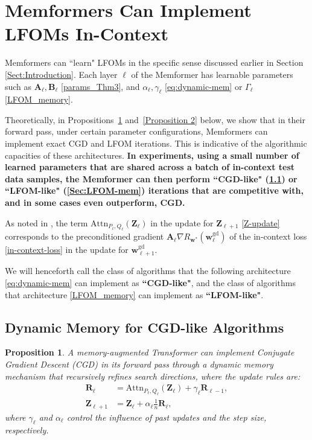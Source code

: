 \documentclass[11pt]{article}
\numberwithin{equation}{section}
\newtheorem{proposition}{Proposition}
\begin{document}
\section{Memformers Can Implement LFOMs In-Context}

Memformers can ``learn" LFOMs in the specific sense discussed earlier in Section \ref{Sect:Introduction}. Each layer \(\ell\) of the Memformer has learnable parameters such as \( \mathbf{A}_{\ell}, \mathbf{B}_{\ell} \) \eqref{params_Thm3}, and \(\alpha_{\ell}, \gamma_{\ell}\) \eqref{eq:dynamic-mem} or \(\Gamma_{\ell}\) \eqref{LFOM_memory}.

Theoretically, in Propositions~\ref{Proposition 1} and~\ref{Proposition 2} below, we show that in their forward pass, under certain parameter configurations, Memformers can implement exact CGD and LFOM iterations. This is indicative of the algorithmic capacities of these architectures. \textbf{In experiments, using a small number of learned parameters that are shared across a batch of in-context test data samples, the Memformer can then perform ``CGD-like" (\ref{Sec:dynamic-mem}) or ``LFOM-like" (\ref{Sec:LFOM-mem}) iterations that are competitive with, and in some cases even outperform, CGD.}

As noted in \cite[Subsection C.1]{ahn2024transformers}, the term \( \mathrm{Attn}_{P_\ell, Q_\ell}(\mathbf{Z}_\ell) \) in the update for \( \mathbf{Z}_{\ell+1} \) \eqref{Z-update} corresponds to the preconditioned gradient \( \mathbf{A}_\ell \nabla R_{\mathbf{w}^*}(\mathbf{w}_{\ell}^\mathrm{gd}) \) of the in-context loss \eqref{in-context-loss} in the update for \(\mathbf{w}_{\ell + 1}^\mathrm{gd}\).

We will henceforth call the class of algorithms that the following architecture \eqref{eq:dynamic-mem} can implement as \textbf{``CGD-like"}, and the class of algorithms that architecture \eqref{LFOM_memory} can implement as \textbf{``LFOM-like"}.

\subsection{Dynamic Memory for CGD-like Algorithms}
\label{Sec:dynamic-mem}

\begin{proposition}\label{Proposition 1}
A memory-augmented Transformer can implement Conjugate Gradient Descent (CGD) in its forward pass through a dynamic memory mechanism that recursively refines search directions, where the update rules are:
\begin{align}
    \mathbf{R}_\ell &= \mathrm{Attn}_{P_\ell, Q_\ell}(\mathbf{Z}_\ell) + \gamma_\ell \mathbf{R}_{\ell-1}, \label{eq:dynamic-mem_update} \\
    \mathbf{Z}_{\ell+1} &= \mathbf{Z}_\ell + \alpha_\ell \frac{1}{n} \mathbf{R}_\ell, \label{eq:dynamic-mem}
\end{align}
where \( \gamma_\ell \) and \( \alpha_\ell \) control the influence of past updates and the step size, respectively.
\end{proposition}
\end{document}
